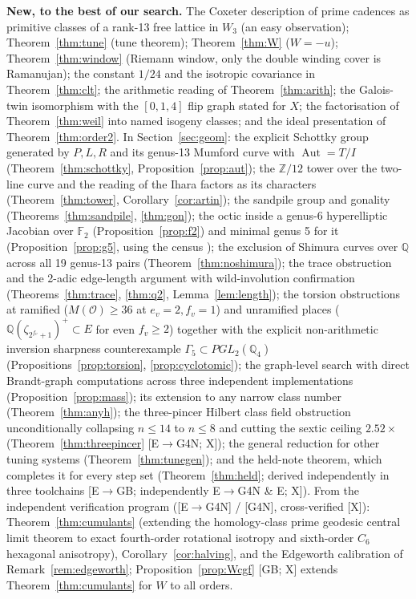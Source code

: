 \documentclass[11pt]{amsart}
\numberwithin{equation}{section}
\theoremstyle{plain}
\theoremstyle{definition}\newtheorem{definition}[theorem]{Definition}
\theoremstyle{remark}\newtheorem{remark}[theorem]{Remark}
\newcommand{\Z}{\mathbb{Z}}\newcommand{\Q}{\mathbb{Q}}\newcommand{\C}{\mathbb{C}}\newcommand{\F}{\mathbb{F}}\newcommand{\R}{\mathbb{R}}
\newcommand{\ctag}[1]{\textup{\textsf{\scriptsize[#1]}}}
\begin{document}
\textbf{New, to the best of our search.} The Coxeter description of prime cadences as primitive classes of a rank-13 free lattice in $W_3$ (an easy observation); Theorem~\ref{thm:tune} (tune theorem); Theorem~\ref{thm:W} ($W=-u$); Theorem~\ref{thm:window} (Riemann window, only the double winding cover is Ramanujan); the constant $1/24$ and the isotropic covariance in Theorem~\ref{thm:clt}; the arithmetic reading of Theorem~\ref{thm:arith}; the Galois-twin isomorphism with the $[0,1,4]$ flip graph stated for $X$; the factorisation of Theorem~\ref{thm:weil} into named isogeny classes; and the ideal presentation of Theorem~\ref{thm:order2}. In Section~\ref{sec:geom}: the explicit Schottky group generated by $P,L,R$ and its genus-13 Mumford curve with $\operatorname{Aut}=T/I$ (Theorem~\ref{thm:schottky}, Proposition~\ref{prop:aut}); the $\Z/12$ tower over the two-line curve and the reading of the Ihara factors as its characters (Theorem~\ref{thm:tower}, Corollary~\ref{cor:artin}); the sandpile group and gonality (Theorems~\ref{thm:sandpile}, \ref{thm:gon}); the octic inside a genus-6 hyperelliptic Jacobian over $\F_2$ (Proposition~\ref{prop:f2}) and minimal genus 5 for it (Proposition~\ref{prop:g5}, using the census \cite{dragutinovic24}); the exclusion of Shimura curves over $\Q$ across all 19 genus-13 pairs (Theorem~\ref{thm:noshimura}); the trace obstruction and the 2-adic edge-length argument with wild-involution confirmation (Theorems~\ref{thm:trace}, \ref{thm:q2}, Lemma~\ref{lem:length}); the torsion obstructions at ramified ($M(\mathcal O)\ge36$ at $e_v=2,f_v=1$) and unramified places ($\Q(\zeta_{2^{f_v}+1})^+\subset E$ for even $f_v\ge2$) together with the explicit non-arithmetic inversion sharpness counterexample $\Gamma_5\subset PGL_2(\Q_4)$ (Propositions~\ref{prop:torsion}, \ref{prop:cyclotomic}); the graph-level search with direct Brandt-graph computations across three independent implementations (Proposition~\ref{prop:mass}); its extension to any narrow class number (Theorem~\ref{thm:anyh}); the three-pincer Hilbert class field obstruction unconditionally collapsing $n\le14$ to $n\le8$ and cutting the sextic ceiling $2.52\times$ (Theorem~\ref{thm:threepincer} \ctag{E$\to$G4N; X}); the general reduction for other tuning systems (Theorem~\ref{thm:tunegen}); and the held-note theorem, which completes it for every step set (Theorem~\ref{thm:held}; derived independently in three toolchains \ctag{E$\to$GB; independently E$\to$G4N \& E; X}). From the independent verification program (\ctag{E$\to$G4N} / \ctag{G4N}, cross-verified \ctag{X}): Theorem~\ref{thm:cumulants} (extending the homology-class prime geodesic central limit theorem \cite{ps87,ks90,lalley89,ps01,liu04,luoroy} to exact fourth-order rotational isotropy and sixth-order $C_6$ hexagonal anisotropy), Corollary~\ref{cor:halving}, and the Edgeworth calibration of Remark~\ref{rem:edgeworth}; Proposition~\ref{prop:Wcgf} \ctag{GB; X} extends Theorem~\ref{thm:cumulants} for $W$ to all orders.
\end{document}
